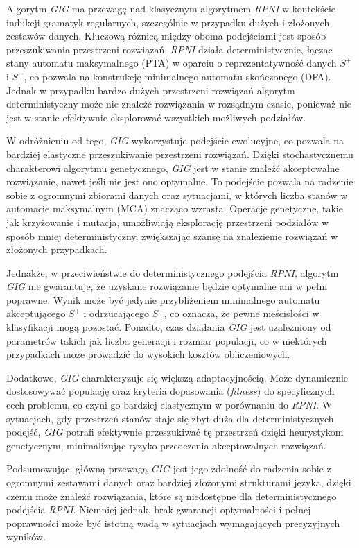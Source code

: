 Algorytm \textit{GIG} ma przewagę nad klasycznym algorytmem \textit{RPNI} w kontekście indukcji gramatyk regularnych, szczególnie w przypadku dużych i złożonych zestawów danych. Kluczową różnicą między oboma podejściami jest sposób przeszukiwania przestrzeni rozwiązań. \textit{RPNI} działa deterministycznie, łącząc stany automatu maksymalnego (PTA) w oparciu o reprezentatywność danych \( S^+ \) i \( S^- \), co pozwala na konstrukcję minimalnego automatu skończonego (DFA). Jednak w przypadku bardzo dużych przestrzeni rozwiązań algorytm deterministyczny może nie znaleźć rozwiązania w rozsądnym czasie, ponieważ nie jest w stanie efektywnie eksplorować wszystkich możliwych podziałów.

W odróżnieniu od tego, \textit{GIG} wykorzystuje podejście ewolucyjne, co pozwala na bardziej elastyczne przeszukiwanie przestrzeni rozwiązań. Dzięki stochastycznemu charakterowi algorytmu genetycznego, \textit{GIG} jest w stanie znaleźć akceptowalne rozwiązanie, nawet jeśli nie jest ono optymalne. To podejście pozwala na radzenie sobie z ogromnymi zbiorami danych oraz sytuacjami, w których liczba stanów w automacie maksymalnym (MCA) znacząco wzrasta. Operacje genetyczne, takie jak krzyżowanie i mutacja, umożliwiają eksplorację przestrzeni podziałów w sposób mniej deterministyczny, zwiększając szansę na znalezienie rozwiązań w złożonych przypadkach.

Jednakże, w przeciwieństwie do deterministycznego podejścia \textit{RPNI}, algorytm \textit{GIG} nie gwarantuje, że uzyskane rozwiązanie będzie optymalne ani w pełni poprawne. Wynik może być jedynie przybliżeniem minimalnego automatu akceptującego \( S^+ \) i odrzucającego \( S^- \), co oznacza, że pewne nieścisłości w klasyfikacji mogą pozostać. Ponadto, czas działania \textit{GIG} jest uzależniony od parametrów takich jak liczba generacji i rozmiar populacji, co w niektórych przypadkach może prowadzić do wysokich kosztów obliczeniowych.

Dodatkowo, \textit{GIG} charakteryzuje się większą adaptacyjnością. Może dynamicznie dostosowywać populację oraz kryteria dopasowania (\textit{fitness}) do specyficznych cech problemu, co czyni go bardziej elastycznym w porównaniu do \textit{RPNI}. W sytuacjach, gdy przestrzeń stanów staje się zbyt duża dla deterministycznych podejść, \textit{GIG} potrafi efektywnie przeszukiwać tę przestrzeń dzięki heurystykom genetycznym, minimalizując ryzyko przeoczenia akceptowalnych rozwiązań.

Podsumowując, główną przewagą \textit{GIG} jest jego zdolność do radzenia sobie z ogromnymi zestawami danych oraz bardziej złożonymi strukturami języka, dzięki czemu może znaleźć rozwiązania, które są niedostępne dla deterministycznego podejścia \textit{RPNI}. Niemniej jednak, brak gwarancji optymalności i pełnej poprawności może być istotną wadą w sytuacjach wymagających precyzyjnych wyników.

